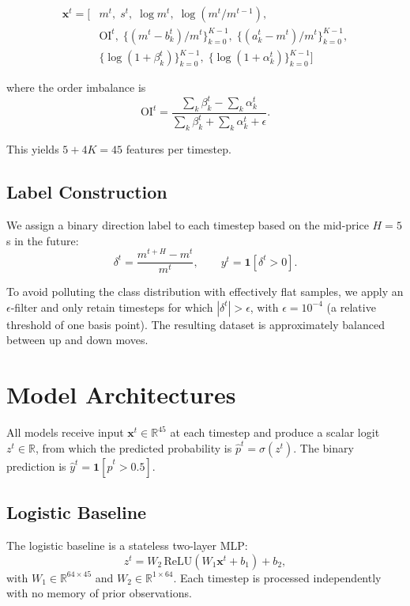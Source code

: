 \documentclass[11pt]{article}
\begin{document}
\begin{align}
  \mathbf{x}^t = \bigl[
    &m^t,\; s^t,\; \log m^t,\; \log(m^t / m^{t-1}), \nonumber\\
    &\text{OI}^t,\;
     \{(m^t - b_k^t)/m^t\}_{k=0}^{K-1},\;
     \{(a_k^t - m^t)/m^t\}_{k=0}^{K-1}, \nonumber\\
    &\{\log(1 + \beta_k^t)\}_{k=0}^{K-1},\;
     \{\log(1 + \alpha_k^t)\}_{k=0}^{K-1}
  \bigr]
\end{align}

where the order imbalance is
\[
  \text{OI}^t = \frac{\sum_k \beta_k^t - \sum_k \alpha_k^t}
                     {\sum_k \beta_k^t + \sum_k \alpha_k^t + \epsilon}.
\]

This yields $5 + 4K = 45$ features per timestep.

\subsection{Label Construction}

We assign a binary direction label to each timestep based on the mid-price
$H = 5$\,s in the future:
\[
  \delta^t = \frac{m^{t+H} - m^t}{m^t}, \qquad
  y^t = \mathbf{1}[\delta^t > 0].
\]

To avoid polluting the class distribution with effectively flat samples, we
apply an $\epsilon$-filter and only retain timesteps for which
$|\delta^t| > \epsilon$, with $\epsilon = 10^{-4}$ (a relative threshold of
one basis point). The resulting dataset is approximately balanced between up
and down moves.

\section{Model Architectures}
\label{sec:models}

All models receive input $\mathbf{x}^t \in \mathbb{R}^{45}$ at each timestep
and produce a scalar logit $z^t \in \mathbb{R}$, from which the predicted
probability is $\hat{p}^t = \sigma(z^t)$. The binary prediction is
$\hat{y}^t = \mathbf{1}[\hat{p}^t > 0.5]$.

\subsection{Logistic Baseline}

The logistic baseline is a stateless two-layer MLP:
\[
  z^t = W_2 \,\text{ReLU}(W_1 \mathbf{x}^t + b_1) + b_2,
\]
with $W_1 \in \mathbb{R}^{64 \times 45}$ and $W_2 \in \mathbb{R}^{1 \times 64}$.
Each timestep is processed independently with no memory of prior observations.
\end{document}
